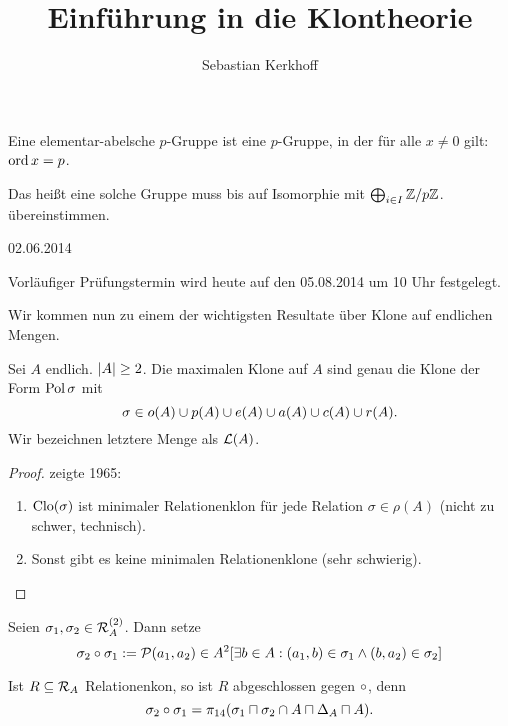 \documentclass{book}
\begin{document}
\title{Einführung in die Klontheorie}
\author{Sebastian Kerkhoff}
\pagestyle{empty}
\maketitle
\clearpage

\begin{definition}\label{elem-ab-p-group}
    Eine elementar-abelsche $p$-Gruppe ist eine $p$-Gruppe, in der für alle $x\neq 0$ gilt:
    $\mathop\mathrm{ord} x = p$.
\end{definition}

\begin{remark}
    Das heißt eine solche Gruppe muss bis auf Isomorphie mit $\bigoplus_{i\in I}{\mathbb{Z}/p\mathbb{Z}}$. übereinstimmen.
\end{remark}

\hfill{02.06.2014}

Vorläufiger Prüfungstermin wird heute auf den 05.08.2014 um 10 Uhr festgelegt.

Wir kommen nun zu einem der wichtigsten Resultate über Klone auf endlichen Mengen.

\begin{theorem}
    Sei $A$ endlich. $\left|A\right|\geq 2$. Die maximalen Klone auf $A$ sind genau die Klone der Form $\mathop\mathrm{Pol}\sigma$ mit
    $$
    \sigma\in o(A)\cup p(A)\cup e(A)\cup a(A)\cup c(A)\cup r(A).
    $$
    Wir bezeichnen letztere Menge als $\mathcal{L}(A)$.
\end{theorem}

\begin{proof}
     zeigte 1965:
    \begin{enumerate}
            \item $\mathrm{Clo}(\sigma)$ ist minimaler Relationenklon für jede Relation $\sigma\in\rho(A)$ (nicht zu schwer, technisch).
            \item Sonst gibt es keine minimalen Relationenklone (sehr schwierig).
    \end{enumerate}
\end{proof}

\begin{definition}
    Seien $\sigma_1,\sigma_2\in \mathcal{R}_A^{(2)}$. Dann setze
    $$
    \sigma_2\compose\sigma_1:=\set{(a_1,a_2)\in A^2}[\exists b\in A:(a_1,b)\in\sigma_1\lgand (b,a_2)\in\sigma_2]
    $$
\end{definition}

\begin{remark}
    Ist $R\subseteq \mathcal{R}_A$ Relationenkon, so ist $R$ abgeschlossen gegen $\circ$, denn
    $$
    \sigma_2\compose\sigma_1=\pi_{14}(\sigma_1\setprod\sigma_2\setmeet A\setprod \Delta_A\setprod A).
    $$
\end{remark}
\end{document}
